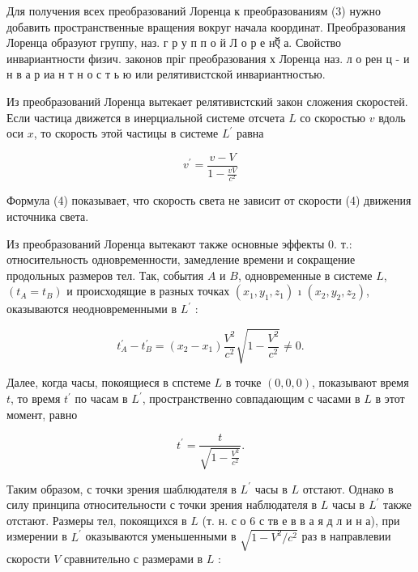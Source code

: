\documentclass[10pt]{article}
\begin{document}
Для получения всех преобразований Лоренца к преобразованиям (3) нужно добавить пространственные вращения вокруг начала координат. Преобразования Лоренца образуют группу, наз. г р у п п о й Л о р е нऍ а. Свойство инвариантности физич. законов пріг преобразования х Лоренца наз. л о рен ц - и н в а р иа н т н о с т ь ю или релятивистской инвариантностью.



Из преобразований Лоренца вытекает релятивистский закон сложения скоростей. Если частица движется в инерциальной системе отсчета $L$ со скоростью $v$ вдоль оси $x$, то скорость этой частицы в системе $L^{\prime}$ равна



\[

v^{\prime}=\frac{v-V}{1-\frac{v V}{c^{2}}}

\]



Формула (4) показывает, что скорость света не зависит от скорости (4) движения источника света.



Из преобразований Лоренца вытекают также основные эффекты 0. т.: относительность одновременности, замедление времени и сокращение продольных размеров тел. Так, события $A$ и $B$, одновременные в системе $L$, $\left(t_{A}=t_{B}\right)$ и происходящие в разных точках $\left(x_{1}, y_{1}, z_{1}\right)$ ı $\left(x_{2}, y_{2}, z_{2}\right)$, оказываются неодновременными в $L^{\prime}$ :



\[

t_{A}^{\prime}-t_{B}^{\prime}=\left(x_{2}-x_{1}\right) \frac{V^{2}}{c^{2}} \sqrt{1-\frac{V^{2}}{c^{2}}} \neq 0 .

\]



Далее, когда часы, покоящиеся в спстеме $L$ в точке $(0,0,0)$, показывают время $t$, то время $t^{\prime}$ по часам в $L^{\prime}$, пространственно совпадающим с часами в $L$ в этот момент, равно



\[

t^{\prime}=\frac{t}{\sqrt{1-\frac{V^{2}}{c^{2}}}} .

\]



Таким образом, с точки зрения шаблюдателя в $L^{\prime}$ часы в $L$ отстают. Однако в силу принципа относительности с точки зрения наблюдателя в $L$ часы в $L^{\prime}$ также отстают. Размеры тел, покоящихся в $L$ (т. н. с о 6 с тв е в в а я д л и н а), при измерении в $L^{\prime}$ оказываются уменьшенными в $\sqrt{1-V^{2} / c^{2}}$ раз в направлевии скорости $V$ сравнительно с размерами в $L$ :
\end{document}
